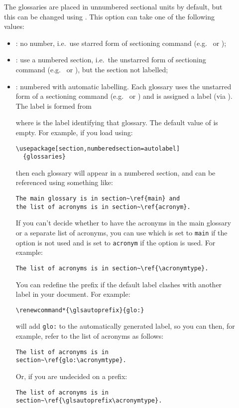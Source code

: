 \documentclass[report,inlinetitle]{nlctdoc}
\begin{document}
\begin{description}
\item[]
The glossaries are placed in unnumbered sectional units by default,
but this can be changed using . This option can take
one of the following values:
\begin{itemize}
\item {}: no number, i.e.\ use starred form
of sectioning command (e.g.\  or );

\item {}:
use a numbered section, i.e.\ the unstarred form of sectioning
command (e.g.\  or ), but 
the section not labelled;

\item {}: numbered with automatic
labelling. Each glossary uses the unstarred form of a sectioning
command (e.g.\  or ) and is assigned a label
(via ). The label is formed from 
\begin{definition}[\DescribeMacro{\glsautoprefix}]
 
\end{definition}
where 
 is the label identifying that glossary. The default
value of  is empty.  For example, if you load 
using:
\begin{verbatim}
\usepackage[section,numberedsection=autolabel]
  {glossaries}
\end{verbatim}
then each glossary will appear in a numbered section, and can
be referenced using something like:
\begin{verbatim}
The main glossary is in section~\ref{main} and 
the list of acronyms is in section~\ref{acronym}.
\end{verbatim}
If you can't decide whether to have the acronyms in the main
glossary or a separate list of acronyms, you can use
 which is set to \texttt{main} if the
 option is not used and is set to \texttt{acronym}
if the  option is used. For example:
\begin{verbatim}
The list of acronyms is in section~\ref{\acronymtype}.
\end{verbatim}
You can redefine the prefix if the default label clashes with
another label in your document.
For example:
\begin{verbatim}
\renewcommand*{\glsautoprefix}{glo:}
\end{verbatim}
will add \texttt{glo:} to the automatically generated label, so
you can then, for example, refer to the list of acronyms as follows:
\begin{verbatim}
The list of acronyms is in 
section~\ref{glo:\acronymtype}.
\end{verbatim}
Or, if you are undecided on a prefix:
\begin{verbatim}
The list of acronyms is in 
section~\ref{\glsautoprefix\acronymtype}.
\end{verbatim}


\end{itemize}
\end{description}
\end{document}
